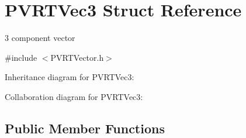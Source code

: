 \hypertarget{struct_p_v_r_t_vec3}{\section{P\+V\+R\+T\+Vec3 Struct Reference}
\label{struct_p_v_r_t_vec3}
}


3 component vector  




{\ttfamily \#include $<$P\+V\+R\+T\+Vector.\+h$>$}



Inheritance diagram for P\+V\+R\+T\+Vec3\+:


Collaboration diagram for P\+V\+R\+T\+Vec3\+:
\subsection*{Public Member Functions}
